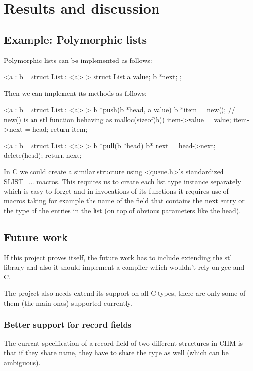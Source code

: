 
\chapter{Results and discussion}

\section{Example: Polymorphic lists}

Polymorphic lists can be implemented as follows:

<a : b ~ struct List : <a> >
struct List
{
    a value;
    b *next;
};

Then we can implement its methods as follows:

<a : b ~ struct List : <a> >
b *push(b *head, a value)
{
    b *item = new(); // new() is an stl function behaving as malloc(sizeof(b))
    item->value = value;
    item->next = head;
    return item;
}

<a : b ~ struct List : <a> >
b *pull(b *head)
{
    b* next = head->next;
    delete(head);
    return next;
}

In C we could create a similar structure using <queue.h>'s standardized SLIST_... macros.
This requires us to create each list type instance separately which is easy to forget
and in invocations of its functions it requires use of macros taking for example the name of the field that
contains the next entry or the type of the entries in the list (on top of obvious parameters like the head).

\section{Future work}

If this project proves itself, the future work has to include extending the stl library and also
it should implement a compiler which wouldn't rely on gcc and C.

The project also needs extend its support on all C types, there are only some of them (the main ones)
supported currently.

\subsection{Better support for record fields}

The current specification of a record field of two different structures in CHM is that if they share name, they have to share the type as well
(which can be ambiguous).

